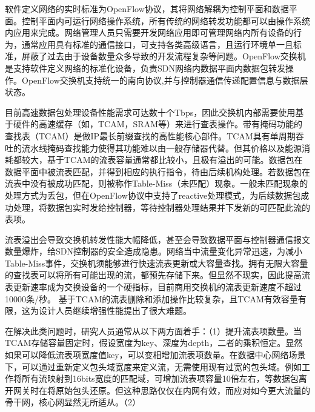 






软件定义网络的实时标准为OpenFlow协议，其将网络解耦为控制平面和数据平面。控制平面内可运行网络操作系统，所有传统的网络转发功能都可以由操作系统内应用来完成。网络管理人员只需要开发网络应用即可管理网络内所有设备的行为，通常应用具有标准的通信接口，可支持各类高级语言，且运行环境单一且标准，屏蔽了过去由于设备数量众多导致的开发流程复杂等问题。OpenFlow交换机是支持软件定义网络的标准化设备，负责SDN网络内数据平面内数据包转发操作。OpenFlow交换机支持统一的南向协议,并与控制器通信传递配置信息与数据层状态。

目前高速数据包处理设备性能需求可达数十个Tbps，因此交换机内部需要使用基于硬件的高速缓存（如，TCAM，SRAM等）来进行查表操作。带有掩码功能的查找表（TCAM）是做IP最长前缀查找的高性能核心部件。TCAM具有单周期吞吐的流水线掩码查找能力使得其功能难以由一般存储器代替。但其价格以及能源消耗都较大，基于TCAM的流表容量通常都比较小，且极有溢出的可能。数据包在数据平面中被流表匹配，并得到相应的执行指令，待由后续机构处理。若数据包在流表中没有被成功匹配，则被称作Table-Miss（未匹配）现象。一般未匹配现象的处理方式为丢包，但在OpenFlow协议中支持了reactive处理模式，为后续数据包成功处理，将数据包实时发给控制器，等待控制器处理结果并下发新的可匹配此流的表项。

流表溢出会导致交换机转发性能大幅降低，甚至会导致数据平面与控制器通信报文数量爆炸，给SDN控制器的安全造成隐患。网络当中流量变化异常迅速，为减小Table-Miss事件，交换机须能够进行快速流表更新或大容量查找。拥有无限大容量的查找表可以将所有可能出现的流，都预先存储下来。但显然不现实，因此提高流表更新速率成为交换设备的一个硬指标，目前商用交换机的流表更新速度不超过10000条/秒。
基于TCAM的流表删除和添加操作比较复杂，且TCAM有效容量有限，这为设计人员继续增强性能提出了很大难题。

在解决此类问题时，研究人员通常从以下两方面着手：（1）提升流表项数量。当TCAM存储容量固定时，假设宽度为key、深度为depth，二者的乘积恒定。显然如果可以降低流表项宽度值key，可以变相增加流表项数量。在数据中心网络场景下，可以通过重新定义包头域宽度来定义流，无需使用现有过宽的包头域。例如工作将所有流映射到16bits宽度的匹配域，可增加流表项容量10倍左右，等数据包离开网关时在将原始包头还原。但这种思路仅仅在内网有效，而应对如今更大流量的骨干网，核心网显然无所适从。（2）





